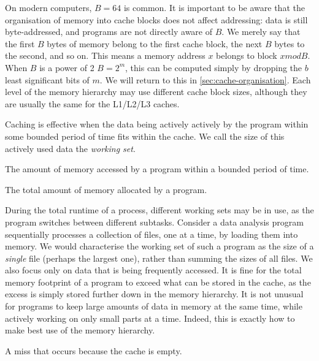 On modern computers, $B=64$ is common.  It is important to be aware
that the organisation of memory into cache blocks does not affect
addressing: data is still byte-addressed, and programs are not
directly aware of $B$.  We merely say that the first $B$ bytes of
memory belong to the first cache block, the next $B$ bytes to the
second, and so on.  This means a memory address $x$ belongs to block
$x mod B$.  When $B$ is a power of 2 $B=2^{m}$, this can be computed
simply by dropping the $b$ least significant bits of $m$.  We will
return to this in \cref{sec:cache-organisation}.  Each level of the
memory hierarchy may use different cache block sizes, although they
are usually the same for the L1/L2/L3 caches.

Caching is effective when the data being actively actively by the
program within some bounded period of time fits within the cache.  We
call the size of this actively used data the \emph{working set}.

\begin{definition}
  The amount of memory accessed by a program within a bounded period
  of time.
\end{definition}

\begin{definition}
  The total amount of memory allocated by a program.
\end{definition}

During the total runtime of a process, different working sets may be
in use, as the program switches between different subtasks.  Consider
a data analysis program sequentially processes a collection of files,
one at a time, by loading them into memory.  We would characterise the
working set of such a program as the size of a \emph{single} file
(perhaps the largest one), rather than summing the sizes of all files.
We also focus only on data that is being frequently accessed.  It is
fine for the total memory footprint of a program to exceed what can be
stored in the cache, as the excess is simply stored further down in
the memory hierarchy.  It is not unusual for programs to keep large
amounts of data in memory at the same time, while actively working on
only small parts at a time.  Indeed, this is exactly how to make best
use of the memory hierarchy.

\begin{definition}
  A miss that occurs because the cache is empty.
\end{definition}

